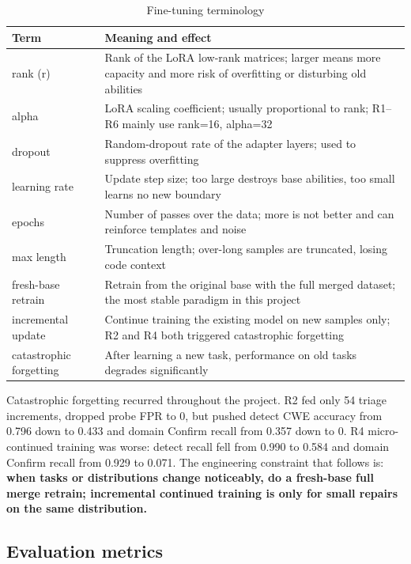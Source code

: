 \documentclass[11pt]{article}
\begin{document}
\begin{table}[h]
\centering
\caption{Fine-tuning terminology}
\label{tab:finetune-en}
\small
\begin{tabularx}{\linewidth}{L{3.0cm}Y}
\toprule
\textbf{Term} & \textbf{Meaning and effect} \\
\midrule
rank (r) & Rank of the LoRA low-rank matrices; larger means more capacity and more risk of overfitting or disturbing old abilities \\
alpha & LoRA scaling coefficient; usually proportional to rank; R1--R6 mainly use rank=16, alpha=32 \\
dropout & Random-dropout rate of the adapter layers; used to suppress overfitting \\
learning rate & Update step size; too large destroys base abilities, too small learns no new boundary \\
epochs & Number of passes over the data; more is not better and can reinforce templates and noise \\
max length & Truncation length; over-long samples are truncated, losing code context \\
fresh-base retrain & Retrain from the original base with the full merged dataset; the most stable paradigm in this project \\
incremental update & Continue training the existing model on new samples only; R2 and R4 both triggered catastrophic forgetting \\
catastrophic forgetting & After learning a new task, performance on old tasks degrades significantly \\
\bottomrule
\end{tabularx}
\end{table}

Catastrophic forgetting recurred throughout the project. R2 fed only 54 triage increments, dropped probe FPR
to 0, but pushed detect CWE accuracy from 0.796 down to 0.433 and domain Confirm recall from 0.357 down to 0.
R4 micro-continued training was worse: detect recall fell from 0.990 to 0.584 and domain Confirm recall from
0.929 to 0.071. The engineering constraint that follows is: \textbf{when tasks or distributions change
noticeably, do a fresh-base full merge retrain; incremental continued training is only for small repairs on
the same distribution.}

\subsection{Evaluation metrics}
\end{document}
